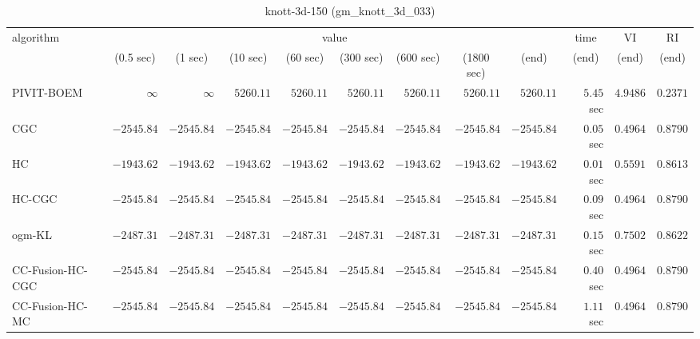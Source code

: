 \begin{table}[H]
\scriptsize
\centering
\caption{knott-3d-150 (gm\_knott\_3d\_033)}
\label{tab:anytimetable-knott-3d-150-gm-knott-3d-033}
\begin{tabular}{lrrrrrrrrrrr}
\toprule
           algorithm &                                   \multicolumn{8}{c}{value} & \multicolumn{1}{c}{time}    & \multicolumn{1}{c}{VI}  & \multicolumn{1}{c}{RI} \\  
\cmidrule(lr){2-9}\cmidrule(lr){10-10} \cmidrule(lr){11-11} \cmidrule(lr){12-12}   
                     & \multicolumn{1}{c}{(0.5 sec)} & \multicolumn{1}{c}{(1 sec)} & \multicolumn{1}{c}{(10 sec)} & \multicolumn{1}{c}{(60 sec)} & \multicolumn{1}{c}{(300 sec)} & \multicolumn{1}{c}{(600 sec)} & \multicolumn{1}{c}{(1800 sec)} & \multicolumn{1}{c}{(end)} & \multicolumn{1}{c}{(end)}    & \multicolumn{1}{c}{(end)}   & \multicolumn{1}{c}{(end)}  \\ \midrule 
          PIVIT-BOEM & $\infty$ & $\infty$ & $      5260.11$ & $      5260.11$ & $      5260.11$ & $      5260.11$ & $      5260.11$ & $      5260.11$ & $         5.45$ sec    & $       4.9486$  & $       0.2371$ \\ 
                 CGC & $     -2545.84$ & $     -2545.84$ & $     -2545.84$ & $     -2545.84$ & $     -2545.84$ & $     -2545.84$ & $     -2545.84$ & $     -2545.84$ & $         0.05$ sec    & $       0.4964$  & $       0.8790$ \\ 
                  HC & $     -1943.62$ & $     -1943.62$ & $     -1943.62$ & $     -1943.62$ & $     -1943.62$ & $     -1943.62$ & $     -1943.62$ & $     -1943.62$ & $         0.01$ sec    & $       0.5591$  & $       0.8613$ \\ 
              HC-CGC & $     -2545.84$ & $     -2545.84$ & $     -2545.84$ & $     -2545.84$ & $     -2545.84$ & $     -2545.84$ & $     -2545.84$ & $     -2545.84$ & $         0.09$ sec    & $       0.4964$  & $       0.8790$ \\ 
              ogm-KL & $     -2487.31$ & $     -2487.31$ & $     -2487.31$ & $     -2487.31$ & $     -2487.31$ & $     -2487.31$ & $     -2487.31$ & $     -2487.31$ & $         0.15$ sec    & $       0.7502$  & $       0.8622$ \\ 
    CC-Fusion-HC-CGC & $     -2545.84$ & $     -2545.84$ & $     -2545.84$ & $     -2545.84$ & $     -2545.84$ & $     -2545.84$ & $     -2545.84$ & $     -2545.84$ & $         0.40$ sec    & $       0.4964$  & $       0.8790$ \\ 
     CC-Fusion-HC-MC & $     -2545.84$ & $     -2545.84$ & $     -2545.84$ & $     -2545.84$ & $     -2545.84$ & $     -2545.84$ & $     -2545.84$ & $     -2545.84$ & $         1.11$ sec    & $       0.4964$  & $       0.8790$ \\ 

\end{tabular}
\end{table}
